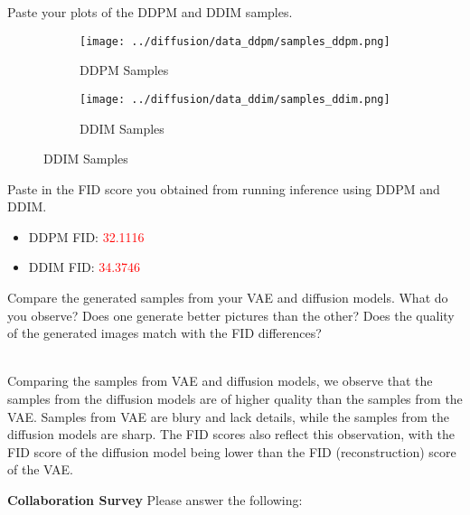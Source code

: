 \documentclass[11pt,addpoints,answers]{exam}
\numberwithin{equation}{section} %
\numberwithin{figure}{section} %
\numberwithin{table}{section} %
\begin{document}
\begin{questions}
\question Paste your plots of the DDPM and DDIM samples.
\begin{solution}
\begin{figure}[H]
    \centering
    \begin{subfigure}[b]{0.48\linewidth}
        \texttt{[image: ../diffusion/data\_ddpm/samples\_ddpm.png]}
        \caption{DDPM Samples}
    \end{subfigure}
    \begin{subfigure}[b]{0.48\linewidth}
        \texttt{[image: ../diffusion/data\_ddim/samples\_ddim.png]}
        \caption{DDIM Samples}
    \end{subfigure}
\end{figure}
\end{solution}
\question Paste in the FID score you obtained from running inference using DDPM and DDIM.
\begin{solution}
\begin{itemize}
    \item DDPM FID: \textcolor{red}{32.1116}
    \item DDIM FID: \textcolor{red}{34.3746}
\end{itemize} 
\end{solution}
\question Compare the generated samples from your VAE and diffusion models. What do you observe? Does one generate better pictures than the other? Does the quality of the generated images match with the FID differences?
\begin{solution}
    \\ Comparing the samples from VAE and diffusion models, we observe that the samples from the diffusion models are of higher quality than the samples from the VAE. 
    Samples from VAE are blury and lack details, while the samples from the diffusion models are sharp.
    The FID scores also reflect this observation, with the FID score of the diffusion model being lower than the FID (reconstruction) score of the VAE.
\end{solution}

\end{questions}
\clearpage

\clearpage

\textbf{Collaboration Survey} Please answer the following:
\end{document}
